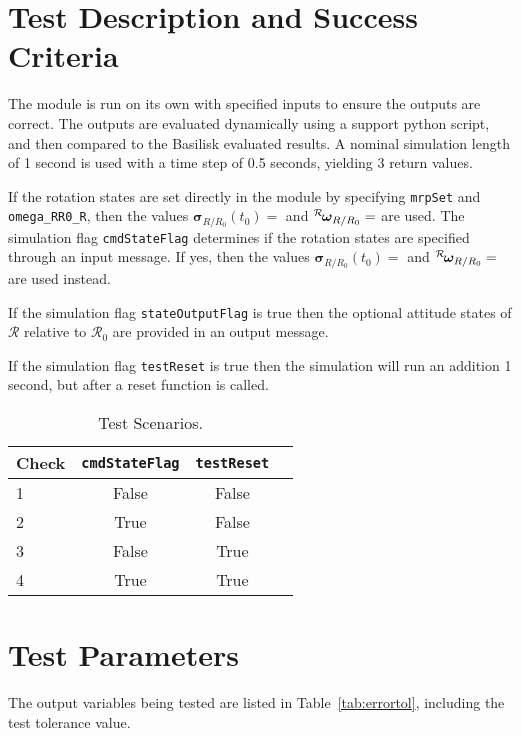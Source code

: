 
\section{Test Description and Success Criteria}
The module is run on its own with specified inputs to ensure the outputs are correct.  The outputs are evaluated dynamically using a support python script, and then compared to the Basilisk evaluated results.  A nominal simulation length of 1 second is used with a time step of 0.5 seconds, yielding 3 return values.

If the rotation states are set directly in the module by specifying {\tt mrpSet} and {\tt omega\_RR0\_R}, then the values $\bm\sigma_{R/R_{0}}(t_{0}) = $ and $\leftexp{R}{\bm\omega}_{R/R_{0}}=$ are used.  The simulation flag {\tt cmdStateFlag} determines if the rotation states are specified through an input message.  If yes, then the values $\bm\sigma_{R/R_{0}}(t_{0}) = $ and $\leftexp{R}{\bm\omega}_{R/R_{0}}=$ are used instead.  

If the simulation flag {\tt stateOutputFlag} is true then  the optional attitude states of $\mathcal{R}$ relative to $\mathcal{R}_{0}$ are provided in an output message.

If the simulation flag {\tt testReset} is true then  the simulation will run an addition 1 second, but after a reset function is called.

\begin{table}[htbp]
	\caption{Test Scenarios.}
	\label{tab:checks}
	\centering \fontsize{10}{10}\selectfont
	\begin{tabular}{ l | c | c | c } %
		\hline\hline
		\textbf{Check}  & {\tt cmdStateFlag} & {\tt testReset}  \\ 
		\hline
		1 & False  & False \\
		2 & True  & False \\
		3 & False  & True \\
		4 & True  & True \\
		\hline\hline
	\end{tabular}
\end{table}

\section{Test Parameters}
The output variables being tested are listed in Table~\ref{tab:errortol}, including the test tolerance value.

